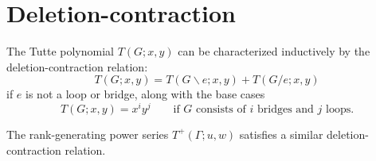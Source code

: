 \documentclass{amsart}
\theoremstyle{definition}
\newcommand{\fanalog}[2]{[\![#2]\!]_{#1}}
\begin{document}

\section{Deletion-contraction}

The Tutte polynomial $T(G; x,y)$ can be characterized inductively by the deletion-contraction relation:
\begin{equation*}
	T(G;x,y) = T(G \backslash e; x,y) + T(G / e; x,y)
\end{equation*}
if $e$ is not a loop or bridge,
along with the base cases 
\begin{equation*}
	T(G; x,y) = x^i y^j \qquad\text{if $G$ consists of $i$ bridges and $j$ loops.}
\end{equation*}

The rank-generating power series $T^+(\Gamma; u,w)$ satisfies a similar deletion-contraction relation.
\end{document}

